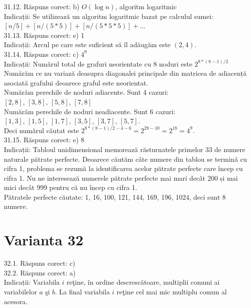 31.12. Răspuns corect: b) $O(\log n)$, algoritm logaritmic\\
Indicații: Se utilizează un algoritm logaritmic bazat pe calculul sumei:\\ $[n / 5]+[n /(5 * 5)]+[n /(5 * 5 * 5)]+\ldots$\\

31.13. Răspuns corect: e) 1\\
Indicații: Arcul pe care este suficient să îl adăugăm este $(2,4)$.\\

31.14. Răspuns corect: c) $4^{9}$\\
Indicații: Numărul total de grafuri neorientate cu 8 noduri este $2^{8 *(8-1) / 2}$\\ Numărăm ce nu variază deasupra diagonalei principale din matricea de adiacență asociată grafului deoarece graful este neorientat.\\ Numărăm perechile de noduri adiacente. Sunt 4 cazuri:\\ $[2,8]$, $[3,8]$, $[5,8]$, $[7,8]$\\ Numărăm perechile de noduri neadiacente. Sunt 6 cazuri:\\ $[1,3]$, $[1,5]$, $[1,7]$, $[3,5]$, $[3,7]$, $[5,7]$.\\ Deci numărul căutat este $2^{8 *(8-1) / 2-4-6}=2^{28-10}=2^{18}=4^{9}$.\\

31.15. Răspuns corect: e) 8\\
Indicații: Tabloul unidimensional memorează răsturnatele primelor 33 de numere naturale pătrate perfecte. Deoarece căutăm câte numere din tablou se termină cu cifra 1, problema se rezumă la identificarea acelor pătrate perfecte care încep cu cifra 1. Nu ne interesează numerele pătrate perfecte mai mari decât 200 și mai mici decât 999 pentru că nu încep cu cifra 1.\\ Pătratele perfecte căutate: 1, 16, 100, 121, 144, 169, 196, 1024, deci sunt 8 numere.\\

\section*{Varianta 32}

32.1. Răspuns corect: c)\\

32.2. Răspuns corect: a)\\
Indicații: Variabila $i$ reţine, în ordine descrescătoare, multiplii comuni ai variabilelor $a$ şi $b$. La final variabila $i$ reţine cel mai mic multiplu comun al acesora.\\

